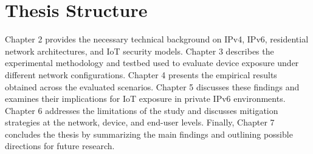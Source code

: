 \section{Thesis Structure}
Chapter 2 provides the necessary technical background on IPv4, IPv6, residential network architectures, and IoT security models. Chapter 3 describes the experimental methodology and testbed used to evaluate device exposure under different network configurations. Chapter 4 presents the empirical results obtained across the evaluated scenarios. Chapter 5 discusses these findings and examines their implications for IoT exposure in private IPv6 environments. Chapter 6 addresses the limitations of the study and discusses mitigation strategies at the network, device, and end-user levels. Finally, Chapter 7 concludes the thesis by summarizing the main findings and outlining possible directions for future research. 

